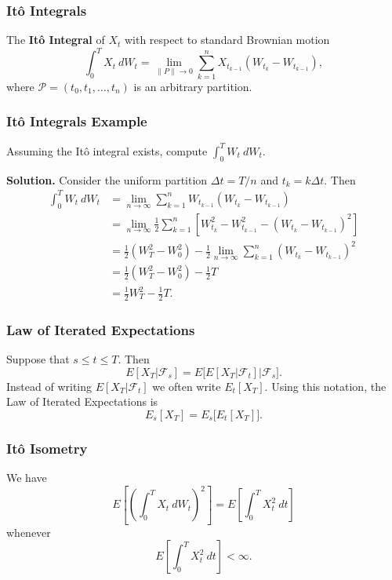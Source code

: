 \documentclass{beamer}
\begin{document}
\begin{frame}
\frametitle{It\^o Integrals}
\begin{Definition}
The {\bf It\^o Integral} of $X_t$ with respect to standard Brownian motion
$$
\int_0^T X_t\ dW_t = \lim_{\| P\|\to 0} \sum_{k = 1}^{n } X_{t_{k - 1}} (W_{t_k} - W_{t_{k - 1}}),
$$
where $\mathcal{P} = (t_0, t_1,\ldots, t_n)$ is an arbitrary partition.
\end{Definition}

\end{frame}

\begin{frame}
\frametitle{It\^o Integrals Example}
\small 
\begin{Example}
Assuming the It\^o integral exists, compute $\int_0^T W_t\ dW_t$.
\end{Example}

{\bf Solution.}
Consider the uniform partition $\Delta t = T/n$ and $t_k = k \Delta t$. Then
\begin{align*}
\int_0^ T W_t\ dW_t 	&= \lim_{n\to\infty}\sum_{k = 1}^n W_{t_{k - 1}} \left(W_{t_k} - W_{t_{k - 1}}\right)\\
				&= \lim_{n\to\infty}\frac{1}{2} \sum_{k = 1}^n \left[ W_{t_k}^2 - W_{t_{k - 1}}^2 - (W_{t_k} - W_{t_{k - 1}})^2\right]\\
				&=  \frac{1}{2} (W_{T}^2 - W_0^2) - \frac{1}{2}\lim_{n\to\infty} \sum_{k = 1}^n (W_{t_k} - W_{t_{k - 1}})^2\\
				&= \frac{1}{2} (W_{T}^2 - W_0^2) - \frac{1}{2}T\\
				&= \frac{1}{2} W_{T}^2 - \frac{1}{2}T.
\end{align*}

\end{frame}

\begin{frame}
\frametitle{Law of Iterated Expectations}
Suppose that $s \leq t \leq T$. Then
$$
E[X_T |\mathcal{F}_s] = E\Big[E[X_T|\mathcal{F}_t] \Big|\mathcal{F}_s\Big].
$$
Instead of writing $E[X_T |\mathcal{F}_t]$ we often write $E_t[X_T]$. Using this notation, the Law of Iterated Expectations is
$$
E_s[X_T] = E_s\Big[E_t[X_T]\Big].
$$
\end{frame}

\begin{frame}
\frametitle{It\^o Isometry}
\begin{Theorem}[It\^o Isometry]
We have
$$
E\left[\left(\int_0^T X_t\ dW_t\right)^2\right] = E\left[\int_0^T X_t^2\ dt\right]
$$
whenever
$$
E\left[\int_0^T X_t^2\ dt\right] < \infty.
$$
\end{Theorem}
\end{frame}
\end{document}
